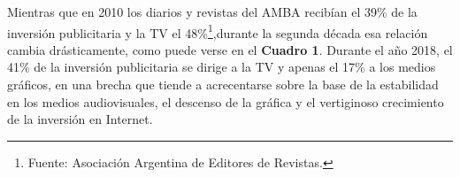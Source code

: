 {%
%

Mientras que en 2010 los diarios y revistas del AMBA recibían el 39\% de la inversión publicitaria y la TV el 48\%\footnote{Fuente: Asociación Argentina de Editores de Revistas.},durante la segunda década esa relación cambia drásticamente, como puede verse en el \textbf{Cuadro 1}. Durante el año 2018, el 41\% de la inversión publicitaria se dirige a la TV y apenas el 17\% a los medios gráficos, en una brecha que tiende a acrecentarse sobre la base de la estabilidad en los medios audiovisuales, el descenso de la gráfica y el vertiginoso crecimiento de la inversión en Internet.

}
